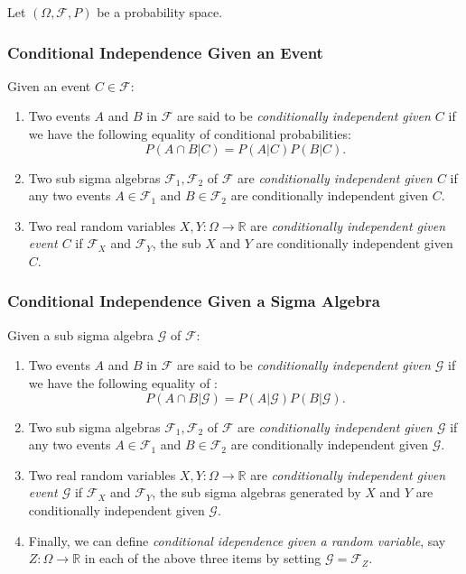 \documentclass[12pt]{article}
\begin{document}
Let $(\Omega,\mathcal{F},P)$ be a probability space.

\subsubsection*{Conditional Independence Given an Event}
Given an event $C\in \mathcal{F}$:
\begin{enumerate}
\item
Two events $A$ and $B$ in $\mathcal{F}$ are said to be \emph{conditionally independent given $C$} if we have the following equality of conditional probabilities:
$$P(A\cap B|C)=P(A|C)P(B|C).$$
\item
Two sub sigma algebras $\mathcal{F}_1,\mathcal{F}_2$ of $\mathcal{F}$ are \emph{conditionally independent given $C$} if any two events $A\in \mathcal{F}_1$ and $B\in \mathcal{F}_2$ are conditionally independent given $C$.
\item
Two real random variables $X,Y:\Omega \to \mathbb{R}$ are \emph{conditionally independent given event $C$} if $\mathcal{F}_X$ and $\mathcal{F}_Y$, the sub  $X$ and $Y$ are conditionally independent given $C$.
\end{enumerate}

\subsubsection*{Conditional Independence Given a Sigma Algebra}
Given a sub sigma algebra $\mathcal{G}$ of $\mathcal{F}$:
\begin{enumerate}
\item
Two events $A$ and $B$ in $\mathcal{F}$ are said to be \emph{conditionally independent given $\mathcal{G}$} if we have the following equality of :
$$P(A\cap B|\mathcal{G})=P(A|\mathcal{G})P(B|\mathcal{G}).$$
\item
Two sub sigma algebras $\mathcal{F}_1,\mathcal{F}_2$ of $\mathcal{F}$ are \emph{conditionally independent given $\mathcal{G}$} if any two events $A\in \mathcal{F}_1$ and $B\in \mathcal{F}_2$ are conditionally independent given $\mathcal{G}$.
\item
Two real random variables $X,Y:\Omega \to \mathbb{R}$ are \emph{conditionally independent given event $\mathcal{G}$} if $\mathcal{F}_X$ and $\mathcal{F}_Y$, the sub sigma algebras generated by $X$ and $Y$ are conditionally independent given $\mathcal{G}$.
\item Finally, we can define \emph{conditional idependence given a random variable}, say $Z:\Omega\to \mathbb{R}$ in each of the above three items by setting $\mathcal{G}=\mathcal{F}_Z$.
\end{enumerate}
\end{document}
